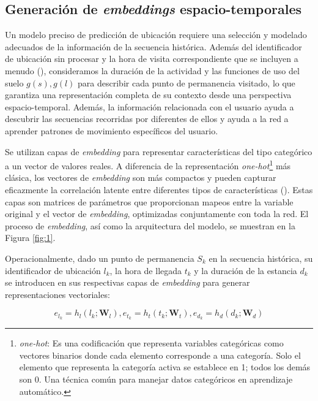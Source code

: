 \subsection{Generación de \textit{embeddings} espacio-temporales}

Un modelo preciso de predicción de ubicación requiere una selección 
y modelado adecuados de la información de la secuencia histórica. 
Además del identificador de ubicación sin procesar y la hora de 
visita correspondiente que se incluyen a menudo (\cite{li2020hierarchical}), 
consideramos la duración de la actividad y las funciones de uso del 
suelo $g(s),g(l)$ para describir cada punto de permanencia visitado, lo que 
garantiza una representación completa de su contexto desde una 
perspectiva espacio-temporal. Además, la información relacionada 
con el usuario ayuda a descubrir las secuencias recorridas por 
diferentes de ellos y ayuda a la red a aprender patrones de 
movimiento específicos del usuario.

Se utilizan capas de \textit{embedding} para representar características 
del tipo categórico a un vector de valores reales. A diferencia de la 
representación \textit{one-hot}\footnote{\textit{one-hot}: Es una codificación que 
representa variables categóricas como vectores binarios donde cada 
elemento corresponde a una categoría. Solo el elemento que 
representa la categoría activa se establece en 1; todos los demás 
son 0. Una técnica común para manejar datos categóricos en 
aprendizaje automático.}
más clásica, los vectores de \textit{embedding} 
son más compactos y pueden capturar eficazmente la correlación 
latente entre diferentes tipos de características (\cite{xu2022understanding}). 
Estas capas son matrices de parámetros que proporcionan mapeos 
entre la variable original y el vector de \textit{embedding}, optimizadas 
conjuntamente con toda la red. El proceso de \textit{embedding}, as\'i
como la arquitectura del modelo, se muestran en la Figura \ref{fig:1}.

Operacionalmente, dado un punto de permanencia \(S_k\) en la 
secuencia histórica, su identificador de ubicación \(l_k\), 
la hora de llegada \(t_k\) y la duración de la estancia \(d_k\) 
se introducen en sus respectivas capas de \textit{embedding} para 
generar representaciones vectoriales:

\begin{equation}
    e_{l_k} = h_l(l_k; \mathbf{W}_l), 
    e_{t_k} = h_t(t_k; \mathbf{W}_t), 
    e_{d_k} = h_d(d_k; \mathbf{W}_d) \tag{1}
    \label{eq:1}
\end{equation}

